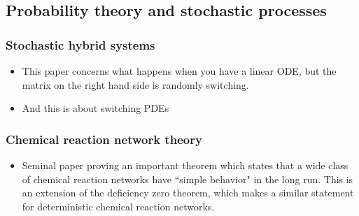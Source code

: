 \documentclass{amsart}
\begin{document}
\subsection{Probability theory and stochastic processes}



\subsubsection{Stochastic hybrid systems}
\begin{itemize}
\item \cite{lawley2013} This paper concerns what happens when you have a linear ODE, but the matrix on the right hand side is randomly switching. 
\item \cite{lawley2016} And this is about switching PDEs
\end{itemize}

\subsubsection{Chemical reaction network theory}
\begin{itemize}
\item \cite{Anderson2008aa} Seminal paper proving an important theorem which states that a wide class of chemical reaction networks have ``simple behavior" in the long run. This is an extension of the deficiency zero theorem, which makes a similar statement for deterministic chemical reaction networks. 
\end{itemize}




\end{document}
